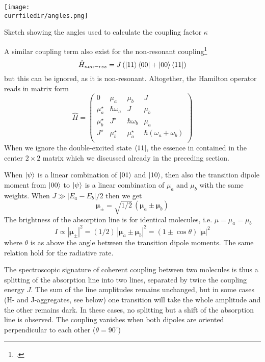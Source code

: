 \begin{marginfigure}
\texttt{[image: \\currfiledir/angles.png]}
\caption{Sketch showing 
the angles used to calculate the coupling factor $\kappa$}
\end{marginfigure}

A similar coupling term also exist for the non-resonant coupling\footcite{knoester-book}
\begin{equation}
\hat{H}_{non-res} = J \left(  \ket{11}\bra{00} + \ket{00}\bra{11}  \right)
\end{equation}
but this can be ignored, as it is non-resonant. Altogether, the Hamilton operator reads in matrix form
\begin{equation}
\hat{H} = \begin{pmatrix}
0   					& \mu_a 						&	\mu_b						& 		J 		\\
\mu_a^\star	& \hbar \omega_a		&	J								& \mu_b	\\
\mu_b^\star  &  J^\star					& \hbar \omega_b		& \mu_a	\\
J^\star				& \mu_b^\star			& \mu_a^\star			& \hbar (\omega_a + \omega_b) \\
\end{pmatrix}
\end{equation}
When we ignore the double-excited state $\bra{11}$, the essence in contained in the center $2 \times 2$ matrix which we discussed already in the preceding section.

When $\ket{\psi}$ is a linear combination of $\ket{01}$ and $\ket{10}$, then also the transition dipole moment from $\ket{00}$ to $\ket{\psi}$ is a linear combination of $\mu_a$ and $\mu_b$ with the same weights. When $J \gg |E_a - E_b| / 2$ then we get
\begin{equation}
 \boldsymbol{\mu}_{\pm} = \sqrt{1/2} \, \left( \boldsymbol{\mu}_a \pm  \boldsymbol{\mu}_b  \right) 
\end{equation}
The brightness of the absorption line is for identical molecules, i.e. $\mu = \mu_a = \mu_b$
\begin{equation}
 I \propto |\boldsymbol{\mu}_{\pm}|^2 = (1/2) \, \left| \boldsymbol{\mu}_a \pm  \boldsymbol{\mu}_b  \right|^2 =  \left( 1 \pm \cos \theta \right) \, \left| \boldsymbol{\mu}   \right| ^2 
\end{equation}
where $\theta$ is as above the angle between the transition dipole moments. The same relation hold for the radiative rate.

The spectroscopic signature of coherent coupling between two molecules is thus a splitting of the absorption line into two lines, separated by twice the coupling energy $J$. The sum of the line amplitudes remains unchanged, but in some cases (H- and J-aggregates, see below) one transition will take the whole amplitude and the other remains dark. In these cases, no splitting but a shift of the absorption line is observed. The coupling vanishes when both dipoles are oriented perpendicular to each other ($\theta = 90^\circ$)


